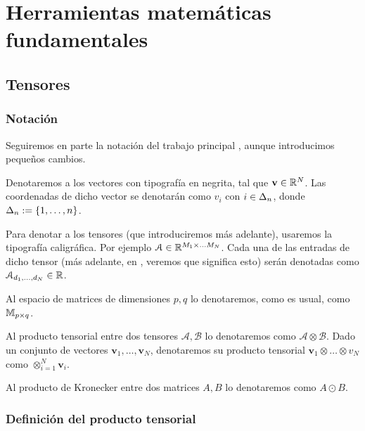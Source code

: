 
\chapter{Herramientas matemáticas fundamentales} \label{ch:matematicas_fundamentales}

\section{Tensores}

\subsection{Notación}

Seguiremos en parte la notación del trabajo principal \cite{matematicas:principal}, aunque introducimos pequeños cambios.

Denotaremos a los vectores con tipografía en negrita, tal que $\mathbf{v} \in \mathbb{R}^N$. Las coordenadas de dicho vector se denotarán como $v_i$ con $i \in \Delta_{n}$, donde $\Delta_{n} := \{1, \ldots, n\}$.

Para denotar a los tensores (que introduciremos más adelante), usaremos la tipografía caligráfica. Por ejemplo $\mathcal{A} \in \mathbb{R}^{M_1 \times \ldots M_N}$. Cada una de las entradas de dicho tensor (más adelante, en , veremos que significa esto) serán denotadas como $\mathcal{A}_{d_1, \ldots, d_N} \in \mathbb{R}$.

Al espacio de matrices de dimensiones $p, q$ lo denotaremos, como es usual, como $\mathbb{M}_{p \times q}$.

Al producto tensorial entre dos tensores $\mathcal{A}, \mathcal{B}$ lo denotaremos como $\mathcal{A} \otimes \mathcal{B}$. Dado un conjunto de vectores $\mathbf{v}_1, \ldots, \mathbf{v}_N$, denotaremos su producto tensorial $\mathbf{v}_1 \otimes \ldots \otimes {v}_N$ como $\otimes_{i = 1}^N \mathbf{v}_i$.

Al producto de Kronecker entre dos matrices $A, B$ lo denotaremos como $A \odot B$.

\subsection{Definición del producto tensorial} \label{sec:deftensor}


